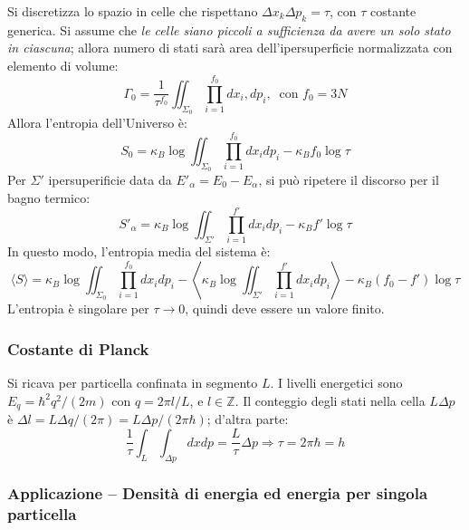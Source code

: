 \documentclass[10pt, a4paper]{scrartcl}
\numberwithin{equation}{subsection}
\theoremstyle{style1}
\theoremstyle{style2}
\begin{document}
Si discretizza lo spazio in celle che rispettano $\Delta x_k \Delta p_k = \tau $, con $\tau $ costante generica. Si assume che \textit{le celle siano piccoli a sufficienza da avere un solo stato in ciascuna}; allora numero di stati sar\`a area dell'ipersuperficie normalizzata con elemento di volume:
\begin{equation}
	\Gamma_0 = \frac{1}{\tau ^{f_0} } \iint_{\Sigma_0} \prod_{i=1} ^{f_0}  dx_i , dp_i , \ \text{ con } f_0 = 3N
\end{equation}
Allora l'entropia dell'Universo \`e:
\begin{equation}
	S_0 = \kappa _B \log \iint_{\Sigma_0} \prod_{i=1} ^{f_0} dx_i dp_i - \kappa _B f_0 \log \tau 
\end{equation}
Per $\Sigma'$ ipersuperificie data da $E'_\alpha  = E_0 - E_\alpha $, si pu\`o ripetere il discorso per il bagno termico:
\begin{equation}
	S'_\alpha  = \kappa _B \log \iint_{\Sigma'} \prod_{i=1} ^{f'} dx_i dp_i - \kappa _B f' \log \tau 
\end{equation}
In questo modo, l'entropia media del sistema \`e:
\begin{equation}
	\langle S \rangle = \kappa _B \log \iint_{\Sigma_0} \prod_{i=1} ^{f_0} dx_i dp_i - \left\langle \kappa _B \log \iint_{\Sigma'} \prod_{i=1} ^{f'} dx_i dp_i \right\rangle - \kappa _B (f_0-f') \log \tau 
\end{equation}
L'entropia \`e singolare per $\tau \to 0$, quindi deve essere un valore finito.

\subsubsection{Costante di Planck}
Si ricava per particella confinata in segmento $L$. I livelli energetici sono $E_q = \hbar ^2 q^2 / (2m)$ con $q = 2\pi l / L$, e $l \in \mathbb{Z}$. Il conteggio degli stati nella cella $L \Delta p$ \`e $\Delta l = L\Delta q / (2\pi) = L\Delta p /(2\pi\hbar )$; d'altra parte:
\[
\frac{1}{\tau }\int_{L} \int_{\Delta p} dxdp = \frac{L}{\tau }\Delta p \Rightarrow \tau  =2\pi \hbar  = h
\] 
\subsubsection{Applicazione -- Densit\`a di energia ed energia per singola particella}\label{1p}
\end{document}
